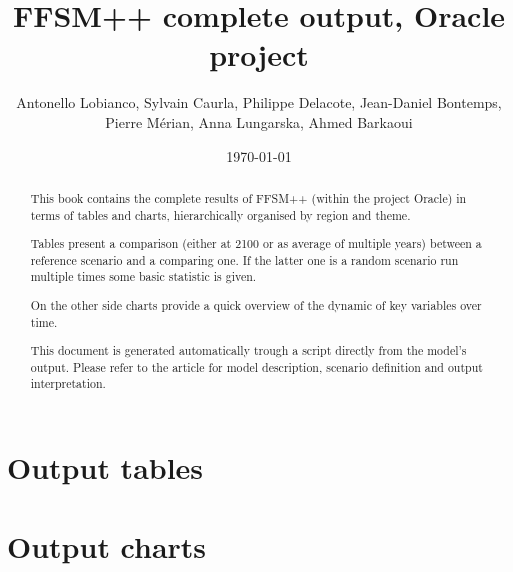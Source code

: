 \documentclass[a4paper,11pt]{article}
\title{FFSM++ complete output, Oracle project}
\author{Antonello Lobianco, Sylvain Caurla, Philippe Delacote, Jean-Daniel Bontemps, Pierre Mérian, Anna Lungarska, Ahmed Barkaoui}
\date{\today}
\begin{document}
\maketitle

\begin{abstract}
This book contains the complete results of FFSM++ (within the project Oracle) in terms of tables and charts, hierarchically organised by region and theme.

Tables present a comparison (either at 2100 or as average of multiple years) between a reference scenario and a comparing one. If the latter one is a random scenario run multiple times some basic statistic is given.

On the other side charts provide a quick overview of the dynamic of key variables over time.

This document is generated automatically trough a script directly from the model's output. Please refer to the article for model description, scenario definition and output interpretation.

\end{abstract}

\thispagestyle{empty}
\newpage
\tableofcontents
\thispagestyle{empty}
\newpage
\part[Tables]{Output tables}

\clearpage
\newpage
\part[Charts]{Output charts}

\clearpage
\newpage
%

%
\end{document}
